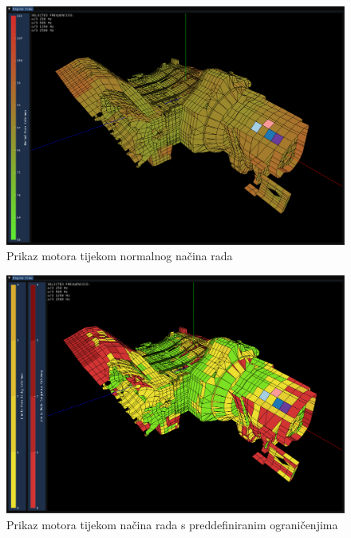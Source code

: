 \documentclass[times, utf8, diplomski]{fer}
\begin{document}
\begin{figure}[H]
\centering
\includegraphics[width=0.85\linewidth]{engine_view_normal_mode.png}
\caption{Prikaz motora tijekom normalnog načina rada}
\label{fig:normal-mode-engine-view}
\end{figure}
\begin{figure}[h]
\centering
\includegraphics[width=0.85\linewidth]{engine_view_limits.png}
\caption{Prikaz motora tijekom načina rada s preddefiniranim ograničenjima}
\label{fig:limits-mode-engine-view}
\end{figure}
\end{document}
